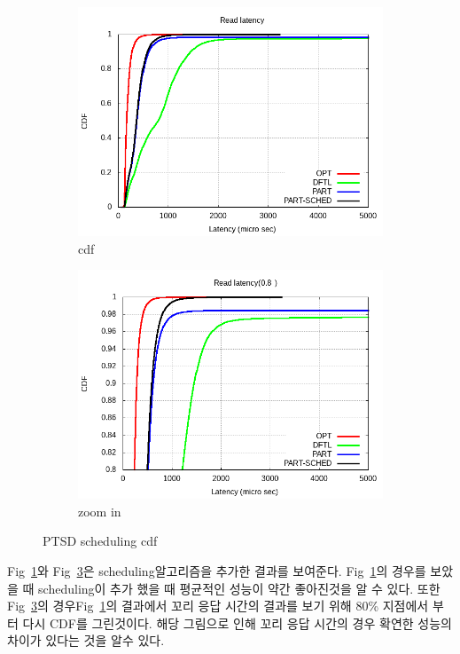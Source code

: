 \documentclass[conference]{IEEEtran}
\begin{document}
\begin{figure}[hbt]
	\centering
	\begin{subfigure}[b]{0.3\textwidth}	
		\includegraphics[width=\linewidth]{image/EVAL/cdf2.png}
		\caption{cdf} \label{fig:cdf2}
	\end{subfigure}
	\begin{subfigure}[b]{0.3\textwidth}	
		\includegraphics[width=\linewidth]{image/EVAL/cdf2_zoom.png}
		\caption{zoom in} \label{fig:cdf2_zoom}
	\end{subfigure}
	\caption{PTSD scheduling cdf}
\end{figure}

Fig~\ref{fig:cdf2}와 Fig~\ref{fig:cdf2_zoom}은 scheduling알고리즘을 추가한 결과를 보여준다.
Fig~\ref{fig:cdf2}의 경우를 보았을 때 scheduling이 추가 했을 때 평균적인 성능이 약간 좋아진것을 
알 수 있다. 또한 Fig~\ref{fig:cdf2_zoom}의 경우Fig~\ref{fig:cdf2}의 결과에서 꼬리 응답 시간의 
결과를 보기 위해 80\% 지점에서 부터 다시 CDF를 그린것이다. 해당 그림으로 인해 꼬리 응답 시간의
경우 확연한 성능의 차이가 있다는 것을 알수 있다.
\end{document}
